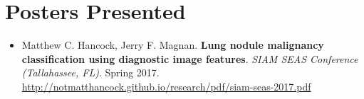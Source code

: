 \documentclass[a4paper,10pt]{report}
\begin{document}
\section{Posters Presented}

\begin{itemize}
    \item Matthew C. Hancock, Jerry F. Magnan. \textbf{Lung nodule malignancy classification using diagnostic image features}. \textit{SIAM SEAS Conference (Tallahassee, FL)}. Spring 2017. \url{http://notmatthancock.github.io/research/pdf/siam-seas-2017.pdf}\end{itemize}

\vspace{0.35in}

\end{document}
